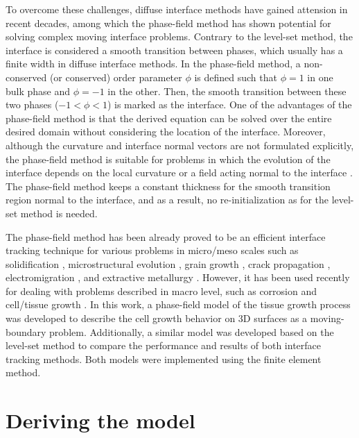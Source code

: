 To overcome these challenges, diffuse interface methods \cite{Anderson1998} have gained attension in recent decades, among which the phase-field method has shown potential for solving complex moving interface problems. Contrary to the level-set method, the interface is considered a smooth transition between phases, which usually has a finite width in diffuse interface methods. In the phase-field method, a non-conserved (or conserved) order parameter $\phi$ is defined such that $\phi=1$ in one bulk phase and $\phi=-1$ in the other. Then, the smooth transition between these two phases ($-1<\phi<1$) is marked as the interface. One of the advantages of the phase-field method is that the derived equation can be solved over the entire desired domain without considering the location of the interface. Moreover, although the curvature and interface normal vectors are not formulated explicitly, the phase-field method is suitable for problems in which the evolution of the interface depends on the local curvature or a field acting normal to the interface \cite{Sun2007}. The phase-field method keeps a constant thickness for the smooth transition region normal to the interface, and as a result, no re-initialization as for the level-set method is needed.



The phase-field method has been already proved to be an efficient interface tracking technique for various problems in micro/meso scales such as solidification \cite{Karma1998,Boettinger2002}, microstructural evolution \cite{Chen2002}, grain growth \cite{Chen1994}, crack propagation \cite{Henry2004,Spatschek2011}, electromigration \cite{Bhate2000}, and extractive metallurgy \cite{Bellemans2017}. However, it has been used recently for dealing with problems described in macro level, such as corrosion \cite{Mai2016,Lin2019,Imanian2018,Lin2020,Ansari2018,Tsuyuki2018,Chadwick2018} and cell/tissue growth \cite{Jeong2017,Lee2019}. In this work, a phase-field model of the tissue growth process was developed to describe the cell growth behavior on 3D surfaces as a moving-boundary problem. Additionally, a similar model was developed based on the level-set method to compare the performance and results of both interface tracking methods. Both models were implemented using the finite element method. 


\section{Deriving the model}

